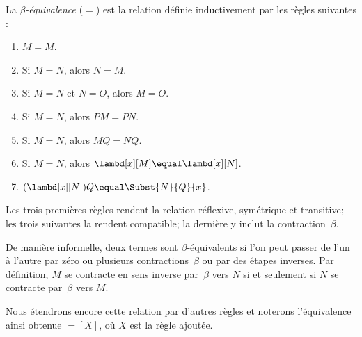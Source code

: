 \documentclass[../../../include/open-logic-section]{subfiles}
\begin{document}
\begin{defn}
La \emph{$\beta$-équivalence} ($\equal$)
est la relation définie inductivement par
les règles suivantes :
\begin{enumerate}
\item $M \equal M$.
\item Si $M \equal N$, alors $N \equal M$.
\item Si $M \equal N$ et $N \equal O$,
  alors $M \equal O$.
\item Si $M \equal N$, alors $PM \equal PN$.
\item Si $M \equal N$, alors $MQ \equal NQ$.
\item Si $M \equal N$, alors
  $\lambd[x][M] \equal \lambd[x][N]$.
\item $(\lambd[x][N])Q \equal \Subst{N}{Q}{x}$.
\end{enumerate}
\end{defn}

Les trois premières règles rendent la
relation réflexive, symétrique et transitive;
les trois suivantes la rendent compatible;
la dernière y inclut la contraction~$\beta$.

De manière informelle, deux termes sont
$\beta$-équivalents si l'on peut passer de
l'un à l'autre par zéro ou plusieurs
contractions~$\beta$ ou par des étapes
inverses. Par définition, $M$ se contracte
en sens inverse par~$\beta$ vers $N$ si et
seulement si $N$ se contracte par~$\beta$
vers $M$.

Nous étendrons encore cette relation par
d'autres règles et noterons l'équivalence
ainsi obtenue $\equal[X]$, où $X$ est la
règle ajoutée.
\end{document}
